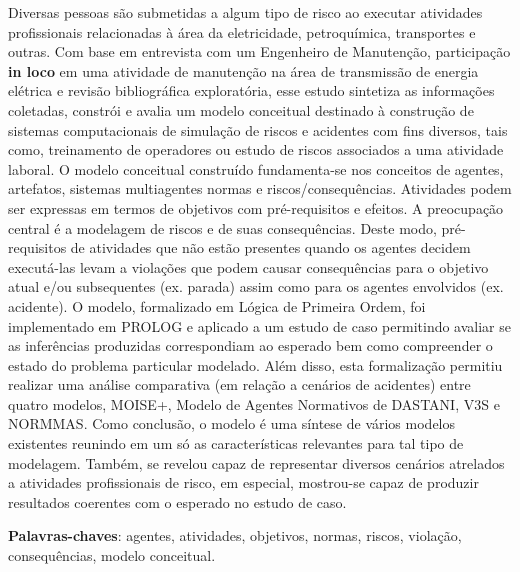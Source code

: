 \begin{resumo}
 Diversas pessoas são submetidas a algum tipo de risco ao executar atividades profissionais relacionadas à área da eletricidade, petroquímica, transportes e outras. Com base em entrevista com um Engenheiro de Manutenção, participação \textbf{in loco} em uma atividade de manutenção na área de transmissão de energia elétrica e revisão bibliográfica exploratória, esse estudo sintetiza as informações coletadas, constrói e avalia um modelo conceitual destinado à construção de sistemas computacionais de simulação de riscos e acidentes com fins diversos, tais como, treinamento de operadores ou estudo de riscos associados a uma atividade laboral. O modelo conceitual construído fundamenta-se nos conceitos de agentes, artefatos, sistemas multiagentes normas e riscos/consequências. Atividades podem ser expressas em termos de objetivos com pré-requisitos e efeitos. A preocupação central é a modelagem de riscos e de suas consequências. Deste modo, pré-requisitos de atividades que não estão presentes quando os agentes decidem executá-las levam a violações que podem causar consequências para o objetivo atual e/ou subsequentes (ex. parada) assim como para os agentes envolvidos (ex. acidente). O modelo, formalizado em Lógica de Primeira Ordem, foi implementado em PROLOG e aplicado a um estudo de caso permitindo avaliar se as inferências produzidas correspondiam ao esperado bem como compreender o estado do problema particular modelado. Além disso, esta formalização permitiu realizar uma análise comparativa (em relação a cenários de acidentes) entre quatro modelos, MOISE+, Modelo de Agentes Normativos de DASTANI, V3S e NORMMAS. Como conclusão, o modelo é uma síntese de vários modelos existentes reunindo em um só as características relevantes para tal tipo de modelagem. Também, se revelou capaz de representar diversos cenários atrelados a atividades profissionais de risco, em especial, mostrou-se capaz de produzir resultados coerentes com o esperado no estudo de caso.

 \vspace{\onelineskip}
    
 \noindent
 \textbf{Palavras-chaves}: agentes, atividades, objetivos, normas, riscos, violação, consequências, modelo conceitual.
\end{resumo}

